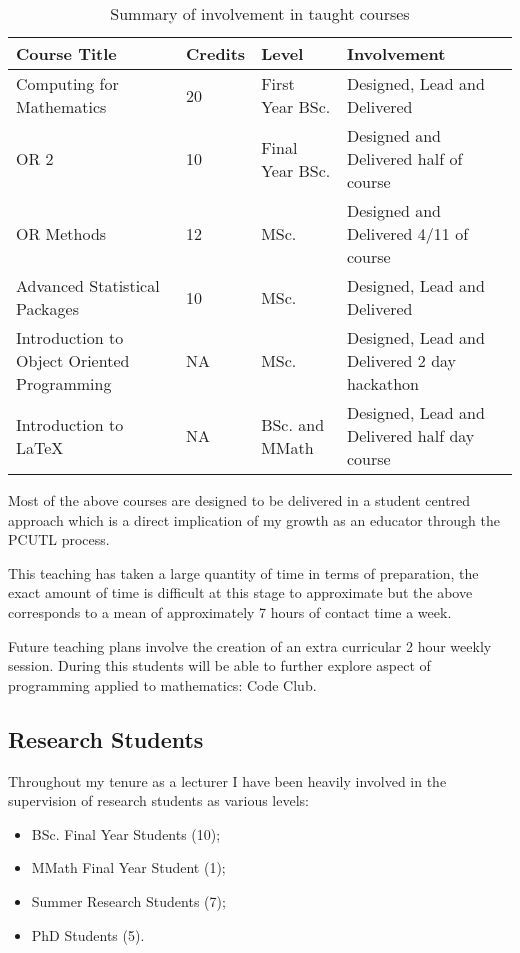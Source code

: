 \documentclass{article}
\begin{document}
\begin{table}[!htbp]
\begin{center}
\begin{tabular}{p{5cm}llp{6cm}}
\toprule
Course Title & Credits & Level & Involvement\\
\midrule
Computing for Mathematics & 20 &  First Year BSc. & Designed, Lead and Delivered\\
OR 2 & 10 &  Final Year BSc.  & Designed and Delivered half of course\\
OR Methods & 12 & MSc. & Designed and Delivered 4/11 of course\\
Advanced Statistical Packages & 10 &  MSc. & Designed, Lead and Delivered\\
Introduction to Object Oriented Programming & NA &  MSc. & Designed, Lead and Delivered 2 day hackathon\\
Introduction to \LaTeX & NA & BSc. and MMath & Designed, Lead and Delivered half day course\\
\bottomrule
\end{tabular}
\caption{Summary of involvement in taught courses}\label{tab:teaching}
\end{center}
\end{table}

Most of the above courses are designed to be delivered in a student centred approach which is a direct implication of my growth as an educator through the PCUTL process.

This teaching has taken a large quantity of time in terms of preparation, the exact amount of time is difficult at this stage to approximate but the above corresponds to a mean of approximately 7 hours of contact time a week.

Future teaching plans involve the creation of an extra curricular 2 hour weekly session. During this students will be able to further explore aspect of programming applied to mathematics: Code Club.

\subsection{Research Students}

Throughout my tenure as a lecturer I have been heavily involved in the supervision of research students as various levels:

\begin{itemize}
    \item BSc. Final Year Students (10);
    \item MMath Final Year Student (1);
    \item Summer Research Students (7);
    \item PhD Students (5).
\end{itemize}
\end{document}
